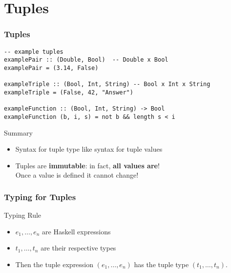 \documentclass{beamer}
\begin{document}
\section{Tuples}
\begin{frame}[fragile]
  \frametitle{Tuples}
  \begin{block}{}
\begin{lstlisting}
-- example tuples
examplePair :: (Double, Bool)  -- Double x Bool
examplePair = (3.14, False)

exampleTriple :: (Bool, Int, String) -- Bool x Int x String
exampleTriple = (False, 42, "Answer")

exampleFunction :: (Bool, Int, String) -> Bool
exampleFunction (b, i, s) = not b && length s < i
\end{lstlisting}
  \end{block}
  \begin{alertblock}{Summary}
    \begin{itemize}
    \item Syntax for tuple type like syntax for tuple values
    \item Tuples are \textbf{immutable}: in fact, \textbf{all values
        are}!\\
      Once a value is defined it cannot change! 
    \end{itemize}
  \end{alertblock}
\end{frame}
\begin{frame}
  \frametitle{Typing for Tuples}
  \begin{block}{Typing Rule}
    \begin{mathpar}
    \end{mathpar}
    \begin{itemize}
    \item $e_1, \dots, e_n$ are Haskell expressions
    \item $t_1, \dots, t_n$ are their respective types
    \item Then the tuple expression $(e_1, \dots, e_n)$ has the tuple
      type $(t_1, \dots, t_n)$.
    \end{itemize}
  \end{block}
\end{frame}
\end{document}
